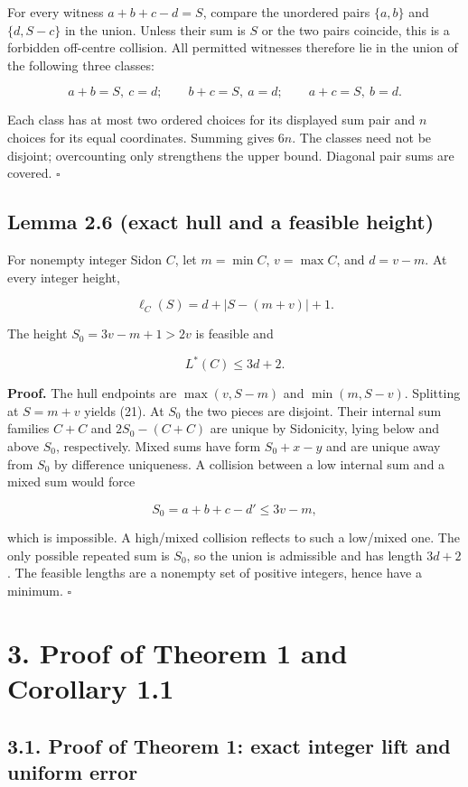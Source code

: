\documentclass[11pt,a4paper]{article}
\begin{document}
For every witness \(a+b+c-d=S\), compare the unordered pairs \(\{a,b\}\) and \(\{d,S-c\}\) in the union. Unless their sum is \(S\) or the two pairs coincide, this is a forbidden off-centre collision. All permitted witnesses therefore lie in the union of the following three classes:

\[a+b=S,\ c=d;\qquad
b+c=S,\ a=d;\qquad
a+c=S,\ b=d.\]

Each class has at most two ordered choices for its displayed sum pair and \(n\) choices for its equal coordinates. Summing gives \(6n\). The classes need not be disjoint; overcounting only strengthens the upper bound. Diagonal pair sums are covered. \hfill\(\square\)

\subsection{Lemma 2.6 (exact hull and a feasible height)}\label{lemma-2.6-exact-hull-and-a-feasible-height}

For nonempty integer Sidon \(C\), let \(m=\min C\), \(v=\max C\), and \(d=v-m\). At every integer height,

\[\ell_C(S)=d+|S-(m+v)|+1.
\tag{21}\]

The height \(S_0=3v-m+1>2v\) is feasible and

\[L^*(C)\le3d+2.
\tag{22}\]

\textbf{Proof.} The hull endpoints are \(\max(v,S-m)\) and \(\min(m,S-v)\). Splitting at \(S=m+v\) yields (21). At \(S_0\) the two pieces are disjoint. Their internal sum families \(C+C\) and \(2S_0-(C+C)\) are unique by Sidonicity, lying below and above \(S_0\), respectively. Mixed sums have form \(S_0+x-y\) and are unique away from \(S_0\) by difference uniqueness. A collision between a low internal sum and a mixed sum would force

\[S_0=a+b+c-d'\le3v-m,\]

which is impossible. A high/mixed collision reflects to such a low/mixed one. The only possible repeated sum is \(S_0\), so the union is admissible and has length \(3d+2\). The feasible lengths are a nonempty set of positive integers, hence have a minimum. \hfill\(\square\)

\section{3. Proof of Theorem 1 and Corollary 1.1}\label{proof-of-theorem-1-and-corollary-1.1}

\subsection{3.1. Proof of Theorem 1: exact integer lift and uniform error}\label{proof-of-theorem-1-exact-integer-lift-and-uniform-error}
\end{document}
